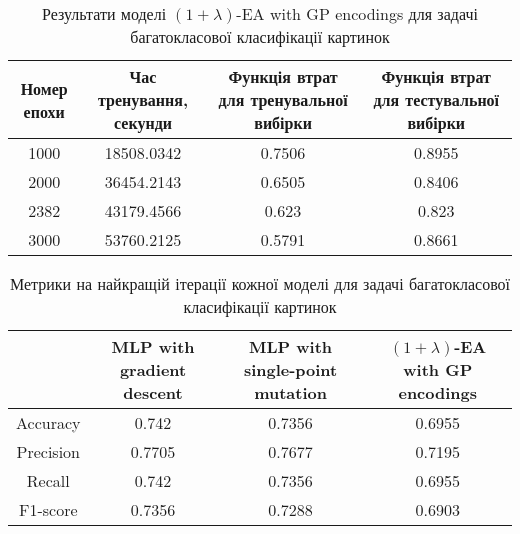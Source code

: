 \begin{table}[ht]
	\centering
	\begin{adjustbox}{max width=\textwidth}
		\begin{tabular}{|c|c|c|c|}
			\hline 
			Номер епохи & Час тренування, секунди & Функція втрат для тренувальної вибірки & Функція втрат для тестувальної вибірки \\
			\hline 
			1000 & 18508.0342 & 0.7506 & 0.8955 \\
			\hline 
			2000 & 36454.2143 & 0.6505 & 0.8406 \\
			\hline
			2382 & 43179.4566 & 0.623 & 0.823 \\
			\hline
			3000 & 53760.2125 & 0.5791 & 0.8661 \\
			\hline
		\end{tabular}
	\end{adjustbox}
	\caption{Результати моделі $(1+\lambda)$-EA with GP encodings для задачі багатокласової класифікації картинок}
	\label{ea_mc_id_results}
\end{table}

\begin{table}[ht]
	\centering
	\begin{adjustbox}{max width=\textwidth}
		\begin{tabular}{|c|c|c|c|}
			\hline 
			& MLP with gradient descent & MLP with single-point mutation & $(1+\lambda)$-EA with GP encodings \\
			\hline 
			Accuracy & 0.742 & 0.7356 & 0.6955 \\
			\hline 
			Precision & 0.7705 & 0.7677 & 0.7195 \\
			\hline
			Recall & 0.742 & 0.7356 & 0.6955 \\
			\hline
			F1-score & 0.7356 & 0.7288 & 0.6903 \\
			\hline
		\end{tabular}
	\end{adjustbox}
	\caption{Метрики на найкращій ітерації кожної моделі для задачі багатокласової класифікації картинок}
	\label{metrics_mc_id_results}
\end{table}

